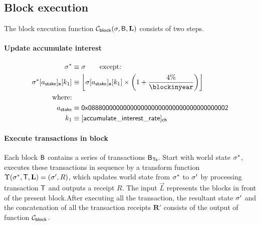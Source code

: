 \subsection{Block execution}\label{sec:block_exec}
The block execution function $\mathcal{C}_{\sf block}(\mathbf{\sigma},\textsf{B},\mathbf{L})$ consists of two steps. 

\paragraph{Update accumulate interest}
\begin{align}
	\st^{*}&\eqdef \st \qquad \mbox{except:} \\ 
	\st^{*}[a_{\sf stake}]_{\bf s}[k_1] & \eqdef \left\lfloor\st[a_{\sf stake}]_{\bf s}[k_1] \times \left(1+\frac{4\%}{\blockinyear}\right)\right\rfloor\\
	\mbox{where:}& \\ 
	a_{\sf stake} & \eqdef \stakingcontract \\ 
	k_1 & \eqdef [{\sf accumulate\char`_interest\char`_rate}]_{\sf ch}
\end{align}

\paragraph{Execute transactions in block}

Each block $\textsf{B}$ contains a series of transactions $\textsf{B}_{\sf Ts}$. Start with world state $\mathbf{\sigma}^{*}$, \name executes these transactions in sequence by a transform function $\Upsilon(\mathbf{\sigma}^{*},\textsf{T},\mathbf{L})=(\mathbf{\sigma}',R)$, which updates world state from $\mathbf{\sigma}^{*}$ to $\mathbf{\sigma}'$ by processing transaction $\textsf{T}$ and outputs a receipt $R$. The input $\vec{L}$ represents the blocks in front of the present block.After executing all the transaction, the resultant state $\mathbf{\sigma}'$ and the concatenation of all the transaction receipts $\mathbf{R}'$ consists of the output of function $\mathcal{C}_{\sf block}$.
